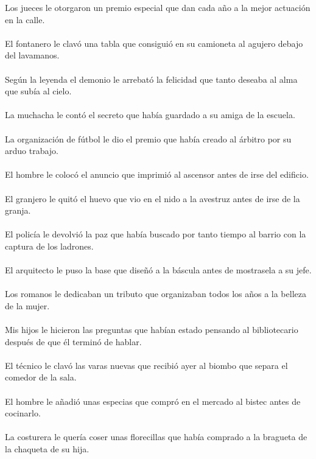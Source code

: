 Los jueces le otorgaron un premio especial que dan cada a\~{n}o a la mejor actuaci\'{o}n en la calle.	\\	\\
El fontanero le clav\'{o} una tabla que consigui\'{o} en su camioneta al agujero debajo del lavamanos.	\\	\\
Seg\'{u}n la leyenda el demonio le arrebat\'{o} la felicidad que tanto deseaba al alma que sub\'{i}a al cielo.	\\	\\
La muchacha le cont\'{o} el secreto que hab\'{i}a guardado a su amiga de la escuela.	\\	\\
La organizaci\'{o}n de f\'{u}tbol le dio el premio que hab\'{i}a creado al \'{a}rbitro por su arduo trabajo.	\\	\\
El hombre le coloc\'{o} el anuncio que imprimi\'{o} al ascensor antes de irse del edificio.	\\	\\
El granjero le quit\'{o} el huevo que vio en el nido a la avestruz antes de irse de la granja.	\\	\\
El polic\'{i}a le devolvi\'{o} la paz que hab\'{i}a buscado por tanto tiempo al barrio con la captura de los ladrones.	\\	\\
El arquitecto le puso la base que dise\~{n}\'{o} a la b\'{a}scula antes de mostrasela a su jefe.	\\	\\
Los romanos le dedicaban un tributo que organizaban todos los a\~{n}os a la belleza de la mujer.	\\	\\
Mis hijos le hicieron las preguntas que hab\'{i}an estado pensando al bibliotecario después de que él termin\'{o} de hablar.	\\	\\
El técnico le clav\'{o} las varas nuevas que recibi\'{o} ayer al biombo que separa el comedor de la sala.	\\	\\
El hombre le a\~{n}adi\'{o} unas especias que compr\'{o} en el mercado al bistec antes de cocinarlo.	\\	\\
La costurera le quer\'{i}a coser unas florecillas que hab\'{i}a comprado a la bragueta de la chaqueta de su hija.	\\	\\

